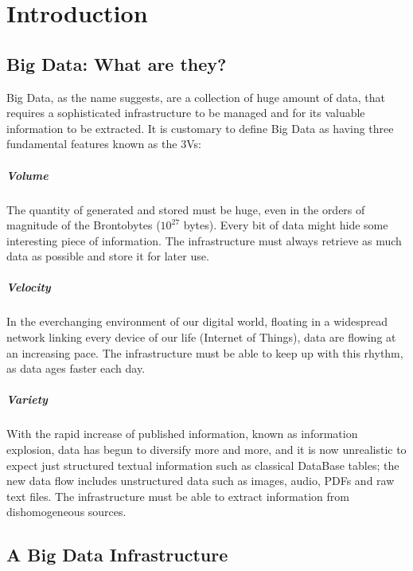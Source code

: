 \chapter{Introduction}

\section{Big Data: What are they?}

Big Data, as the name suggests, are a collection of huge amount of data, that requires a sophisticated infrastructure to be managed and for its valuable information to be extracted.\newline
It is customary to define Big Data as having three fundamental features known as the 3Vs:

\paragraph{Volume}

The quantity of generated and stored must be huge, even in the orders of magnitude of the Brontobytes ($10^{27}$ bytes).
Every bit of data might hide some interesting piece of information. The infrastructure must always retrieve as much data as possible and store it for later use.

\paragraph{Velocity}

In the everchanging environment of our digital world, floating in a widespread network linking every device of our life (Internet of Things), data are flowing at an increasing pace. The infrastructure must be able to keep up with this rhythm, as data ages faster each day.

\paragraph{Variety}

With the rapid increase of published information, known as information explosion, data has begun to diversify more and more, and it is now unrealistic to expect just structured textual information such as classical DataBase tables; the new data flow includes unstructured data such as images, audio, PDFs and raw text files. The infrastructure must be able to extract information from dishomogeneous sources.

\section{A Big Data Infrastructure}\label{Chapter2}

